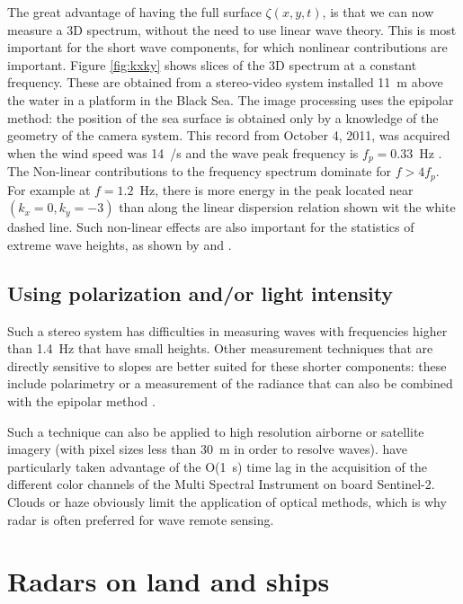 The great advantage of having the full surface $\zeta(x,y,t)$, is that we can now measure a 3D spectrum, without the need to use linear wave theory. 
This is most important for the short wave components, for which nonlinear contributions are important. Figure \ref{fig:kxky} shows slices of the 3D spectrum 
at a constant frequency. These are obtained from a stereo-video system installed 11~m above the water in a platform in the Black Sea. The image processing 
uses the epipolar method: the position of the sea surface is obtained only by a knowledge of the geometry of the camera system.
This record from October 4, 2011, was acquired when the wind speed was 14~/s and the wave  peak frequency is $f_p=0.33$~Hz \citep{Leckler&al.2015}. The 
Non-linear contributions to the frequency spectrum dominate for $f > 4 f_p$. For example at $f=1.2$~Hz, there is more energy in the peak located near $(k_x=0,k_y=-3)$ 
than along the linear dispersion relation shown wit the white dashed line. 
Such non-linear effects are also important for the statistics of extreme wave heights, as shown by \cite{Fedele&al.2013} and \cite{Benetazzo&al.2017}.



\subsection{Using polarization and/or light intensity}
Such a stereo system has difficulties in measuring waves with frequencies higher than 1.4~Hz that have small heights. Other measurement techniques that 
are directly sensitive to slopes are better suited for these shorter components: these include polarimetry \citep{Zappa&al.2008} or a measurement of 
the radiance that can also be combined with the epipolar method \citep{Gallego&al.2011,Yurovskaya&al.2013}. 

Such a technique can also be applied to high resolution airborne or satellite imagery (with pixel sizes less than 30~m in order to resolve waves). 
\cite{Kudryavtsev&al.2017} have particularly taken advantage of the O(1~s) time lag in the acquisition of the different color channels of the Multi Spectral Instrument 
on board Sentinel-2. Clouds or haze obviously limit the application of optical methods, which is why radar is often preferred for wave remote sensing. 

\section{Radars on land and ships}
